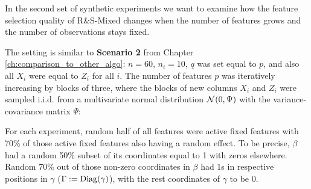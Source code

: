 \documentclass[11pt,letterpaper]{article}
\newcommand{\ouralgo}{R\&S-Mixed }
\numberwithin{equation}{section} %
\numberwithin{figure}{section} %
\numberwithin{table}{section} %
\begin{document}
In the second set of synthetic experiments we want to examine how the feature selection quality of \ouralgo changes when the number of features grows and the number of observations stays fixed. 

The setting is similar to \textbf{Scenario 2} from Chapter \ref{ch:comparison_to_other_algo}: $n = 60$, $n_i = 10$, $q$ was set equal to $p$, and also all $X_i$ were equal to $Z_i$ for all $i$. The number of features $p$ was iteratively increasing by blocks of three, where the blocks of new columns $X_i$ and $Z_i$ were sampled i.i.d. from a multivariate normal distribution $\operatorname{\mathcal{N}}(0, \Psi)$ with the variance-covariance matrix $\Psi$:
	
	For each experiment, random half of all features were active fixed features with 70\% of those active fixed features also having a random effect. To be precise, $\beta$ had a random 50\% subset of its coordinates equal to 1 with zeros elsewhere. Random 70\% out of those non-zero coordinates in $\beta$ had 1s in respective positions in $\gamma$ ($\Gamma := \operatorname{Diag}(\gamma)$), with the rest coordinates of $\gamma$ to be 0. 
	
\end{document}
